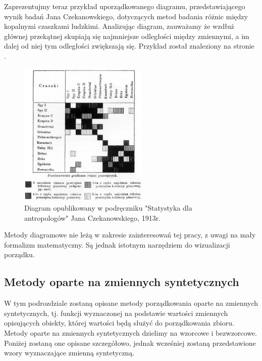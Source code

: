 \documentclass[12pt,a4paper]{report}
\begin{document}
Zaprezentujmy teraz przykład uporządkowanego diagramu, przedstawiającego wynik badań Jana Czekanowskiego, dotyczących metod badania różnic między kopalnymi czaszkami ludzkimi. Analizując diagram, zauważamy że wzdłuż głównej przekątnej skupiają się najmniejsze odległości między zmiennymi, a im dalej od niej tym odległości zwiększają się. Przykład został znaleziony na stronie \cite{czekanowski}. 
\begin{figure}[h]
\centering
\includegraphics[width=0.55\textwidth]{img/diagram_maczek.jpg}
\caption{Diagram opublikowany w podręczniku "Statystyka dla antropologów" Jana Czekanowskiego, 1913r.}
\label{fig:obrazek1}
\end{figure}

Metody diagramowe nie leżą w zakresie zainteresowań tej pracy, z uwagi na mały formalizm matematyczny. Są jednak istotnym narzędziem do wizualizacji porządku. 




\subsection{Metody oparte na zmiennych syntetycznych}

W tym podrozdziale zostaną opisane metody porządkowania oparte na zmiennych syntetycznych, tj. funkcji wyznaczonej na podstawie wartości zmiennych opisujących obiekty, której wartości będą służyć do porządkowania zbioru. Metody oparte na zmiennych syntetycznych dzielimy na wzorcowe i bezwzorcowe. Poniżej zostaną one opisane szczegółowo, jednak wcześniej zostaną przedstawione wzory wyznaczające zmienną syntetyczną. 
\end{document}
